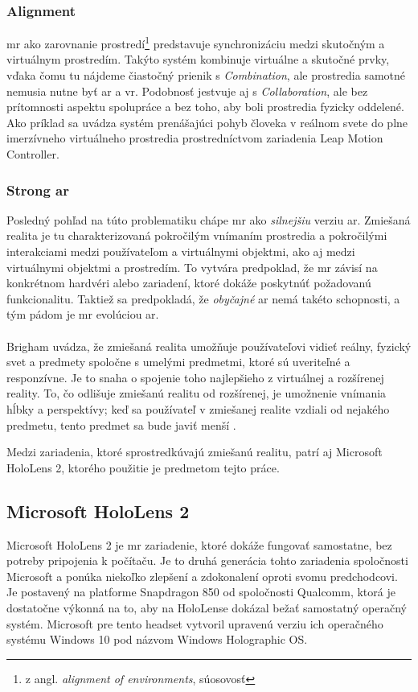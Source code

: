 \subsubsection{Alignment}
\acrshort{mr} ako zarovnanie prostredí\footnote{z angl. \emph{alignment of environments}, súosovosť} predstavuje synchronizáciu medzi skutočným a virtuálnym prostredím.
Takýto systém kombinuje virtuálne a skutočné prvky, vďaka čomu tu nájdeme čiastočný prienik s \emph{Combination}, ale prostredia samotné nemusia nutne byť \acrshort{ar}
a \acrshort{vr}. Podobnosť jestvuje aj s \emph{Collaboration}, ale bez prítomnosti aspektu spolupráce a bez toho, aby boli prostredia fyzicky oddelené. Ako príklad sa 
uvádza systém prenášajúci pohyb človeka v reálnom svete do plne imerzívneho virtuálneho prostredia prostredníctvom zariadenia Leap Motion Controller.

\subsubsection{Strong \acrshort{ar}}
Posledný pohľad na túto problematiku chápe \acrshort{mr} ako \emph{silnejšiu} verziu \acrshort{ar}. Zmiešaná realita je tu charakterizovaná pokročilým vnímaním prostredia
a pokročilými interakciami medzi používateľom a virtuálnymi objektmi, ako aj medzi virtuálnymi objektmi a prostredím. To vytvára predpoklad, že \acrshort{mr} závisí
na konkrétnom hardvéri alebo zariadení, ktoré dokáže poskytnúť požadovanú funkcionalitu. Taktiež sa predpokladá, že \emph{obyčajné} \acrshort{ar} nemá takéto schopnosti,
a tým pádom je \acrshort{mr} evolúciou \acrshort{ar}. \\\\
\noindent
Brigham uvádza, že zmiešaná realita umožňuje používateľovi vidieť reálny, fyzický svet a predmety spoločne s umelými predmetmi, ktoré sú uveriteľné a responzívne. Je to snaha o spojenie
toho najlepšieho z virtuálnej a rozšírenej reality. To, čo odlišuje zmiešanú realitu od rozšírenej, je umožnenie vnímania hĺbky a perspektívy; keď sa používateľ v zmiešanej
realite vzdiali od nejakého predmetu, tento predmet sa bude javiť menší \cite{brighamRealityCheckBasics2017}.

Medzi zariadenia, ktoré sprostredkúvajú zmiešanú realitu, patrí aj Microsoft HoloLens 2, ktorého použitie je predmetom tejto práce.
\subsection{Microsoft HoloLens 2}
Microsoft HoloLens 2 je \acrshort{mr} zariadenie, ktoré dokáže fungovať samostatne, bez potreby pripojenia k počítaču. Je to druhá generácia tohto zariadenia spoločnosti 
Microsoft a ponúka niekoľko zlepšení a zdokonalení oproti svomu predchodcovi. Je postavený na platforme Snapdragon 850 od spoločnosti Qualcomm, ktorá je dostatočne
výkonná na to, aby na HoloLense dokázal bežať samostatný operačný systém. Microsoft pre tento headset vytvoril upravenú verziu ich operačného systému Windows 10 pod
názvom Windows Holographic OS. 

